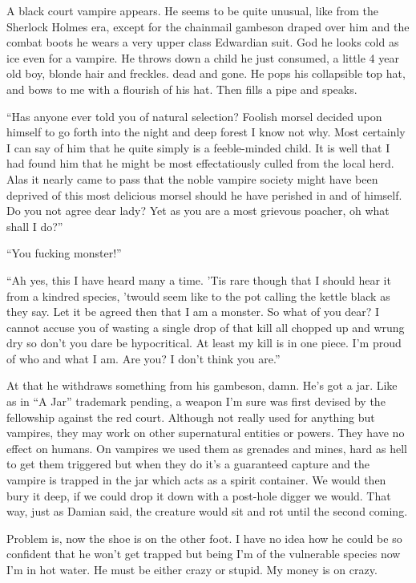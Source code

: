 A black court vampire appears. He seems to be quite unusual, like from the Sherlock Holmes era, except for the chainmail gambeson draped over him and the combat boots he wears a very upper class Edwardian suit. God he looks cold as ice even for a vampire. He throws down a child he just consumed, a little 4 year old boy, blonde hair and freckles. dead and gone. He pops his collapsible top hat, and bows to me with a flourish of his hat. Then fills a pipe and speaks.

``Has anyone ever told you of natural selection? Foolish morsel decided upon himself to go forth into the night and deep forest I know not why. Most certainly I can say of him that he quite simply is a feeble-minded child. It is well that I had found him that he might be most effectatiously culled from the local herd. Alas it nearly came to pass that the noble vampire society might have been deprived of this most delicious morsel should he have perished in and of himself. Do you not agree dear lady? Yet as you are a most grievous poacher, oh what shall I do?''

``You fucking monster!''

``Ah yes, this I have heard many a time. 'Tis rare though that I should hear it from a kindred species, 'twould seem like to the pot calling the kettle black as they say. Let it be agreed then that I am a monster. So what of you dear? I cannot accuse you of wasting a single drop of that kill all chopped up and wrung dry so don't you dare be hypocritical. At least my kill is in one piece. I'm proud of who and what I am. Are you? I don't think you are.''

At that he withdraws something from his gambeson, damn. He's got a jar. Like as in ``A Jar'' trademark pending, a weapon I'm sure was first devised by the fellowship against the red court. Although not really used for anything but vampires, they may work on other supernatural entities or powers. They have no effect on humans. On vampires we used them as grenades and mines, hard as hell to get them triggered but when they do it's a guaranteed capture and the vampire is trapped in the jar which acts as a spirit container. We would then bury it deep, if we could drop it down with a post-hole digger we would. That way, just as Damian said, the creature would sit and rot until the second coming.

Problem is, now the shoe is on the other foot. I have no idea how he could be so confident that he won't get trapped but being I'm of the vulnerable species now I'm in hot water. He must be either crazy or stupid. My money is on crazy.

